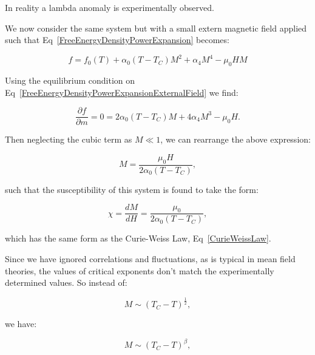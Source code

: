 \noindent In reality a lambda anomaly is experimentally observed.

\noindent We now consider the same system but with a small extern magnetic field applied such that Eq~\ref{FreeEnergyDensityPowerExpansion} becomes:

\begin{equation}
    f = f_0(T) + \alpha_0 (T - T_C) M^2 + \alpha_4 M^4 - \mu_0 H M
    \label{FreeEnergyDensityPowerExpansionExternalField}
\end{equation}

\noindent Using the equilibrium condition on Eq~\ref{FreeEnergyDensityPowerExpansionExternalField} we find:

\begin{equation}
    \frac{\partial f}{\partial m} = 0 = 2\alpha_0 (T - T_C)M + 4\alpha_4 M^3 - \mu_0 H.
    \label{EquilibriumConditionExternalField}
\end{equation}

\noindent Then neglecting the cubic term as $M \ll 1$, we can rearrange the above expression:

\begin{equation}
    M = \frac{\mu_0 H}{2\alpha_0 (T - T_C)},
    \label{MagnetisationExternalField}
\end{equation}

\noindent such that the susceptibility of this system is found to take the form:

\begin{equation}
    \chi = \frac{dM}{dH} = \frac{\mu_0}{2\alpha_0(T - T_C)},
    \label{SusceptibilityExternalField}
\end{equation}

\noindent which has the same form as the Curie-Weiss Law, Eq~\ref{CurieWeissLaw}.

\noindent Since we have ignored correlations and fluctuations, as is typical in mean field theories, the values of critical exponents don't match the experimentally determined values. So instead of:

\begin{equation}
    M \sim (T_C - T)^{\frac{1}{2}},
    \label{CriticalExponentMagnetisationMeanField}
\end{equation}

\noindent we have:

\begin{equation}
    M \sim (T_C - T)^{\beta},
    \label{CriticalExponentMagnetisation}
\end{equation}


